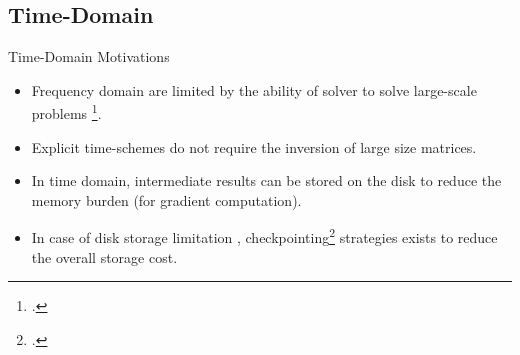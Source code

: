 \subsection{Time-Domain}
\begin{frame}{Time-Domain Motivations}

\begin{itemize}
\item<2-> Frequency domain are limited by the ability of solver to solve large-scale problems \footcite{operto20073d}.
\item<3-> Explicit time-schemes do not require the inversion of large size matrices.
\item<4-> In time domain, intermediate results can be stored on the disk to reduce the memory burden (for gradient computation).
\item<5-> In case of disk storage limitation , checkpointing\footcite{griewankAchievingLogarithmicGrowth1992} strategies exists to reduce the overall storage cost.
\end{itemize}

\end{frame}



